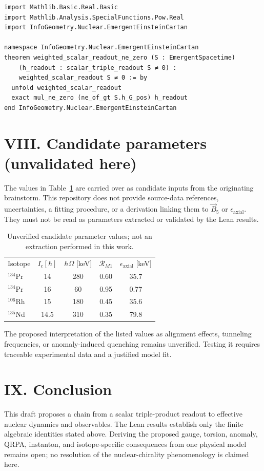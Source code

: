 \documentclass[aps,prl,reprint,superscriptaddress,nofootinbib,amsmath,amssymb]{revtex4-2}
\begin{document}
\begin{lstlisting}
import Mathlib.Basic.Real.Basic
import Mathlib.Analysis.SpecialFunctions.Pow.Real
import InfoGeometry.Nuclear.EmergentEinsteinCartan

namespace InfoGeometry.Nuclear.EmergentEinsteinCartan
theorem weighted_scalar_readout_ne_zero (S : EmergentSpacetime)
    (h_readout : scalar_triple_readout S ≠ 0) :
    weighted_scalar_readout S ≠ 0 := by
  unfold weighted_scalar_readout
  exact mul_ne_zero (ne_of_gt S.h_G_pos) h_readout
end InfoGeometry.Nuclear.EmergentEinsteinCartan
\end{lstlisting}

\section{VIII. Candidate parameters (unvalidated here)}
The values in Table~\ref{tab:candidate} are carried over as candidate inputs from the originating brainstorm. This repository does not provide source-data references, uncertainties, a fitting procedure, or a derivation linking them to $\vec{B}_5$ or $\epsilon_{\text{axial}}$. They must not be read as parameters extracted or validated by the Lean results.

\begin{table}[h!]
\centering
\caption{Unverified candidate parameter values; not an extraction performed in this work.}\label{tab:candidate}
\begin{ruledtabular}
\begin{tabular}{lcccc}
Isotope & $I_c [\hbar]$ & $\hbar\Omega$ [keV] & $\mathcal{R}_{M1}$ & $\epsilon_{\text{axial}}$ [keV] \\
\colrule
$^{134}$Pr & 14 & 280 & 0.60 & 35.7 \\
$^{134}$Pr & 16 & 60 & 0.95 & 0.77 \\
$^{106}$Rh & 15 & 180 & 0.45 & 35.6 \\
$^{135}$Nd & 14.5 & 310 & 0.35 & 79.8 \\
\end{tabular}
\end{ruledtabular}
\end{table}

The proposed interpretation of the listed values as alignment effects, tunneling frequencies, or anomaly-induced quenching remains unverified. Testing it requires traceable experimental data and a justified model fit.

\section{IX. Conclusion}
This draft proposes a chain from a scalar triple-product readout to effective nuclear dynamics and observables. The Lean results establish only the finite algebraic identities stated above. Deriving the proposed gauge, torsion, anomaly, QRPA, instanton, and isotope-specific consequences from one physical model remains open; no resolution of the nuclear-chirality phenomenology is claimed here.
\end{document}
